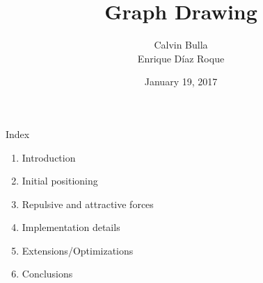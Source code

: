 \documentclass{beamer}
\title{Graph Drawing}
\date{January 19, 2017}
\author{Calvin Bulla \\ Enrique Díaz Roque}
\institute{Algorithms for VLSI}
\begin{document}
\maketitle


\begin{frame}{Index}
\begin{enumerate}
\item Introduction
\item Initial positioning
\item Repulsive and attractive forces
\item Implementation details
\item Extensions/Optimizations
\item Conclusions
\end{enumerate}
\end{frame}
\end{document}
